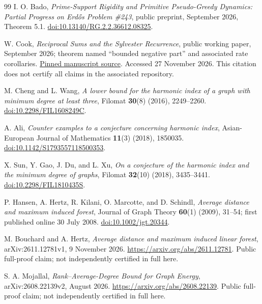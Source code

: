 \documentclass[11pt,a4paper]{article}
\theoremstyle{definition}
\theoremstyle{remark}\newtheorem{remark}[theorem]{Remark}
\begin{document}
\begin{thebibliography}{99}
I. O. Bado, \emph{Prime-Support Rigidity and Primitive Pseudo-Greedy
Dynamics: Partial Progress on Erd\H{o}s Problem \#243}, public
preprint, September 2026, Theorem 5.1.
\href{https://doi.org/10.13140/RG.2.2.36612.08325}{doi:10.13140/RG.2.2.36612.08325}.

W. Cook, \emph{Reciprocal Sums and the Sylvester Recurrence},
public working paper, September 2026; theorem named
``bounded negative part'' and associated rate corollaries.
\href{https://github.com/wcook04/plectis-erdos/blob/a501de956765730ba4e6c9ad284e6d65855d533a/paper/243/erdos-243-reciprocal-tail-rigidity.tex}{Pinned manuscript source}.
Accessed 27 November 2026. This citation does not certify all
claims in the associated repository.

M. Cheng and L. Wang, \emph{A lower bound for the harmonic index
of a graph with minimum degree at least three}, Filomat
\textbf{30}(8) (2016), 2249--2260.
\href{https://doi.org/10.2298/FIL1608249C}{doi:10.2298/FIL1608249C}.

A. Ali, \emph{Counter examples to a conjecture concerning harmonic
index}, Asian-European Journal of Mathematics \textbf{11}(3)
(2018), 1850035.
\href{https://doi.org/10.1142/S1793557118500353}{doi:10.1142/S1793557118500353}.

X. Sun, Y. Gao, J. Du, and L. Xu, \emph{On a conjecture of the
harmonic index and the minimum degree of graphs}, Filomat
\textbf{32}(10) (2018), 3435--3441.
\href{https://doi.org/10.2298/FIL1810435S}{doi:10.2298/FIL1810435S}.

P. Hansen, A. Hertz, R. Kilani, O. Marcotte, and D. Schindl,
\emph{Average distance and maximum induced forest}, Journal
of Graph Theory \textbf{60}(1) (2009), 31--54; first published
online 30 July 2008.
\href{https://doi.org/10.1002/jgt.20344}{doi:10.1002/jgt.20344}.

M. Bouchard and A. Hertz, \emph{Average distance and maximum
induced linear forest}, arXiv:2611.12781v1, 9 November 2026.
\url{https://arxiv.org/abs/2611.12781}.
Public full-proof claim; not independently certified in full here.

S. A. Mojallal, \emph{Rank--Average-Degree Bound for Graph Energy},
arXiv:2608.22139v2, August 2026.
\url{https://arxiv.org/abs/2608.22139}.
Public full-proof claim; not independently certified in full here.

\end{thebibliography}
\end{document}
